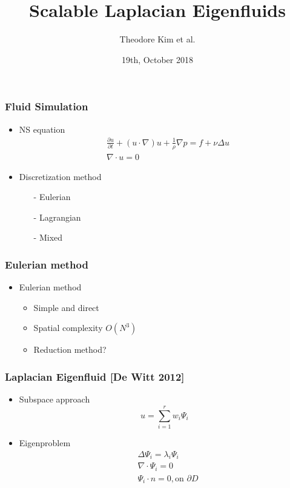 \documentclass[serif,mathserif, 12pt]{beamer}
\title[\hspace{2em}\insertframenumber/\inserttotalframenumber]{Scalable Laplacian Eigenfluids}
\date{19th, October 2018}
\author{Theodore Kim et al.}
\begin{document}
\maketitle

\begin{frame}
  \frametitle{Fluid Simulation}
  \begin{itemize}
  \item NS equation
    \[
    \begin{split}
      &\frac{\partial u}{\partial t}+(u\cdot \nabla )u+\frac{1}{\rho}\nabla p
      = f+\nu \Delta u \\
      &\nabla \cdot u = 0
    \end{split}
    \]
   \pause
  \item Discretization method
    \begin{itemize}
    \item[-] Eulerian
    \item[-] Lagrangian
    \item[-] Mixed
    \end{itemize}
  \end{itemize}
\end{frame}

\begin{frame}
  \frametitle{Eulerian method}
  \begin{itemize}
  \item Eulerian method   
    \begin{itemize}
    \item Simple and direct
      \pause
    \item Spatial complexity $O(N^3)$
      \pause
    \item Reduction method?
    \end{itemize}
  \end{itemize}
\end{frame}

\begin{frame}
  \frametitle{Laplacian Eigenfluid [De Witt 2012]}
  \begin{itemize}
  \item Subspace approach
    \[
    u = \sum_{i=1}^r w_i \Psi_i
    \]
  \item<2-> Eigenproblem
    \[
    \begin{split}
      &\Delta \Psi_i = \lambda_i \Psi_i \\
      &\nabla \cdot \Psi_i = 0 \\
      &\Psi_i \cdot n = 0, \text{on~} \partial D
    \end{split}
    \]
  \end{itemize}
\end{frame}
\end{document}
